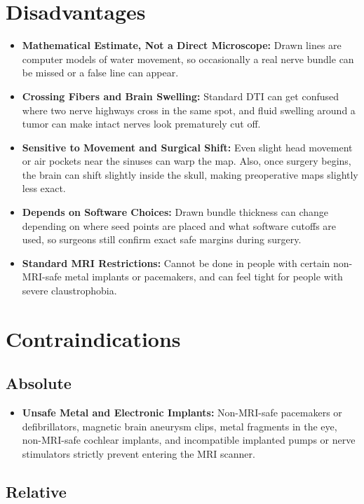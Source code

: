 \section{Disadvantages}

\begin{itemize}
    \item \textbf{Mathematical Estimate, Not a Direct Microscope:} Drawn lines are computer models of water movement, so occasionally a real nerve bundle can be missed or a false line can appear.
    \item \textbf{Crossing Fibers and Brain Swelling:} Standard DTI can get confused where two nerve highways cross in the same spot, and fluid swelling around a tumor can make intact nerves look prematurely cut off.
    \item \textbf{Sensitive to Movement and Surgical Shift:} Even slight head movement or air pockets near the sinuses can warp the map. Also, once surgery begins, the brain can shift slightly inside the skull, making preoperative maps slightly less exact.
    \item \textbf{Depends on Software Choices:} Drawn bundle thickness can change depending on where seed points are placed and what software cutoffs are used, so surgeons still confirm exact safe margins during surgery.
    \item \textbf{Standard MRI Restrictions:} Cannot be done in people with certain non-MRI-safe metal implants or pacemakers, and can feel tight for people with severe claustrophobia.
\end{itemize}

\section{Contraindications}

\subsection{Absolute}

\begin{itemize}
    \item \textbf{Unsafe Metal and Electronic Implants:} Non-MRI-safe pacemakers or defibrillators, magnetic brain aneurysm clips, metal fragments in the eye, non-MRI-safe cochlear implants, and incompatible implanted pumps or nerve stimulators strictly prevent entering the MRI scanner.
\end{itemize}

\subsection{Relative}

